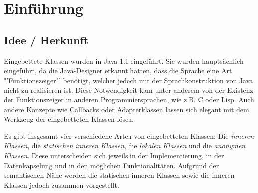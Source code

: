 \chapter{Einführung}
\section{Idee / Herkunft}

Eingebettete Klassen wurden in Java 1.1 eingeführt. \cite{Oracle:JDK_Doku1.1.4}
Sie wurden hauptsächlich eingeführt, da die Java-Designer erkannt hatten, dass die Sprache eine Art "'Funktionszeiger"' benötigt, welcher jedoch mit der Sprachkonstruktion von Java nicht zu realisieren ist.
Diese Notwendigkeit kam unter anderem von der Existenz der Funktionszeiger in anderen Programmiersprachen, wie z.B. C oder Lisp.
Auch andere Konzepte wie Callbacks oder Adapterklassen lassen sich elegant mit dem Werkzeug der eingebetteten Klassen lösen.

Es gibt insgesamt vier verschiedene Arten von eingebetteten Klassen: Die {\it inneren} {\it Klassen}, die {\it statischen} {\it inneren} {\it Klassen}, die {\it lokalen} {\it Klassen}
und die {\it anonymen} {\it Klassen}.
Diese unterscheiden sich jeweils in der Implementierung, in der Datenkapselung und in den möglichen Funktionalitäten.
Aufgrund der semantischen Nähe werden die statischen inneren Klassen sowie die inneren Klassen jedoch zusammen vorgestellt.

\newpage
